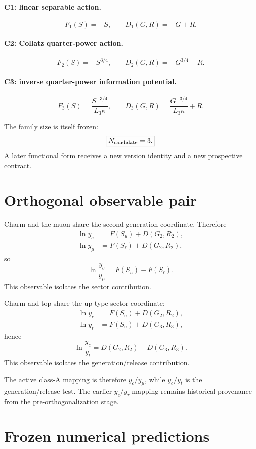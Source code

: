 \paragraph{C1: linear separable action.}
\[
F_1(S)=-S,
\qquad
D_1(G,R)=-G+R.
\]

\paragraph{C2: Collatz quarter-power action.}
\[
F_2(S)=-S^{3/4},
\qquad
D_2(G,R)=-G^{3/4}+R.
\]

\paragraph{C3: inverse quarter-power information potential.}
\[
F_3(S)=\frac{S^{-3/4}}{L_3\kappa},
\qquad
D_3(G,R)=\frac{G^{-3/4}}{L_3\kappa}+R.
\]

The family size is itself frozen:
\[
\boxed{N_{\rm candidate}=3.}
\]
A later functional form receives a new version identity and a new prospective
contract.

\section{Orthogonal observable pair}

Charm and the muon share the second-generation coordinate.  Therefore
\[
\begin{aligned}
\ln y_c&=F(S_u)+D(G_2,R_2),\\
\ln y_\mu&=F(S_\ell)+D(G_2,R_2),
\end{aligned}
\]
so
\[
\boxed{
\ln\frac{y_c}{y_\mu}=F(S_u)-F(S_\ell).
}
\]
This observable isolates the sector contribution.

Charm and top share the up-type sector coordinate:
\[
\begin{aligned}
\ln y_c&=F(S_u)+D(G_2,R_2),\\
\ln y_t&=F(S_u)+D(G_3,R_3),
\end{aligned}
\]
hence
\[
\boxed{
\ln\frac{y_c}{y_t}
=D(G_2,R_2)-D(G_3,R_3).
}
\]
This observable isolates the generation/release contribution.

The active class-A mapping is therefore \(y_c/y_\mu\), while \(y_c/y_t\) is the
generation/release test.  The earlier \(y_c/y_\tau\) mapping remains historical
provenance from the pre-orthogonalization stage.

\section{Frozen numerical predictions}

